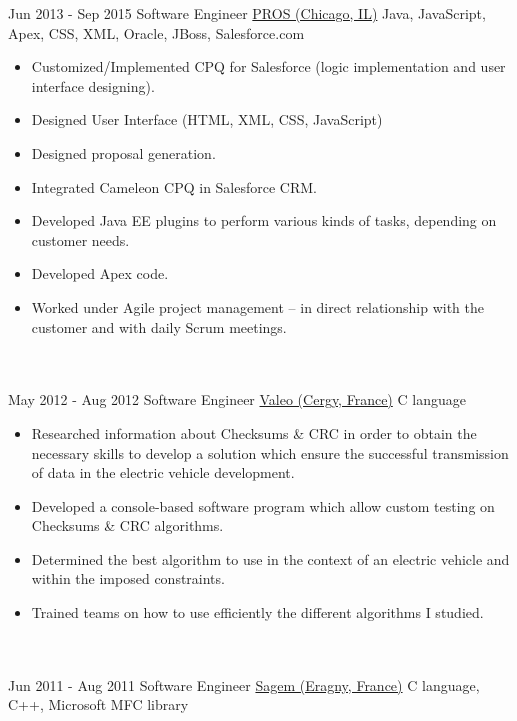 \documentclass[letterpaper]{template} %
\begin{document}
\begin{twenty}
	\twentyitem
    	{Jun 2013 - Sep 2015}
		{}
        {Software Engineer}
        {\href{https://pros.com/}{PROS (Chicago, IL)}}
        {Java, JavaScript, Apex, CSS, XML, Oracle, JBoss, Salesforce.com}
        {\begin{itemize}
            \item Customized/Implemented CPQ for Salesforce (logic implementation and user interface designing).
            \item Designed User Interface (HTML, XML, CSS, JavaScript)
            \item Designed proposal generation. 
            \item Integrated Cameleon CPQ in Salesforce CRM.
            \item Developed Java EE plugins to perform various kinds of tasks, depending on customer needs.
            \item Developed Apex code.
            \item Worked under Agile project management – in direct relationship with the customer and with daily Scrum meetings.
        \end{itemize}}
    \\\divider\\
    \twentyitem
        {May 2012 - Aug 2012}
        {}
        {Software Engineer}
        {\href{https://www.valeo.com/en/}{Valeo (Cergy, France)}}
        {C language}
        {\begin{itemize}
            \item Researched information about Checksums \& CRC in order to obtain the necessary skills to develop a solution which ensure the successful transmission of data in the electric vehicle development.
            \item Developed a console-based software program which allow custom testing on Checksums \& CRC algorithms.
            \item Determined the best algorithm to use in the context of an electric vehicle and within the imposed constraints.
            \item Trained teams on how to use efficiently the different algorithms I studied.
        \end{itemize}}
    \\\divider\\
    \twentyitem
   		{Jun 2011 - Aug 2011}
		{}
        {Software Engineer}
        {\href{https://www.safran-group.com/}{Sagem (Eragny, France)}}
        {C language, C++, Microsoft MFC library}

\end{twenty}
\end{document}
